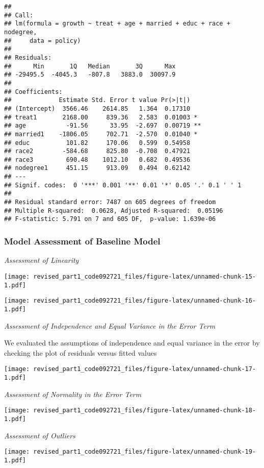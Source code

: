 \documentclass[
]{article}
\begin{document}
\begin{verbatim}
## 
## Call:
## lm(formula = growth ~ treat + age + married + educ + race + nodegree, 
##     data = policy)
## 
## Residuals:
##      Min       1Q   Median       3Q      Max 
## -29495.5  -4045.3   -807.8   3883.0  30097.9 
## 
## Coefficients:
##             Estimate Std. Error t value Pr(>|t|)   
## (Intercept)  3566.46    2614.85   1.364  0.17310   
## treat1       2168.00     839.36   2.583  0.01003 * 
## age           -91.56      33.95  -2.697  0.00719 **
## married1    -1806.05     702.71  -2.570  0.01040 * 
## educ          101.82     170.06   0.599  0.54958   
## race2        -584.68     825.80  -0.708  0.47921   
## race3         690.48    1012.10   0.682  0.49536   
## nodegree1     451.15     913.09   0.494  0.62142   
## ---
## Signif. codes:  0 '***' 0.001 '**' 0.01 '*' 0.05 '.' 0.1 ' ' 1
## 
## Residual standard error: 7487 on 605 degrees of freedom
## Multiple R-squared:  0.0628, Adjusted R-squared:  0.05196 
## F-statistic: 5.791 on 7 and 605 DF,  p-value: 1.639e-06
\end{verbatim}

\hypertarget{model-assessment-of-baseline-model}{%
\subsubsection{Model Assessment of Baseline
Model}\label{model-assessment-of-baseline-model}}

\emph{Assessment of Linearity}

\texttt{[image: revised\_part1\_code092721\_files/figure-latex/unnamed-chunk-15-1.pdf]}

\texttt{[image: revised\_part1\_code092721\_files/figure-latex/unnamed-chunk-16-1.pdf]}

\emph{Assessment of Independence and Equal Variance in the Error Term}

We evaluated the assumptions of independence and equal variance in the
error by checking the plot of residuals versus fitted values

\texttt{[image: revised\_part1\_code092721\_files/figure-latex/unnamed-chunk-17-1.pdf]}

\emph{Assessment of Normality in the Error Term}

\texttt{[image: revised\_part1\_code092721\_files/figure-latex/unnamed-chunk-18-1.pdf]}

\emph{Assessment of Outliers}

\texttt{[image: revised\_part1\_code092721\_files/figure-latex/unnamed-chunk-19-1.pdf]}
\end{document}
